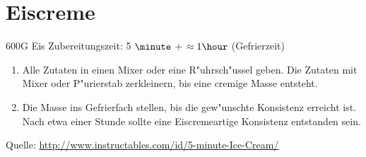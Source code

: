 \chapter{Eiscreme}
600G Eis \hfill Zubereitungszeit: 5 $\minute$ + $\approx1 \hour$ (Gefrierzeit)
\begin{enumerate}
\item	Alle Zutaten in einen Mixer oder eine R"uhrsch"ussel geben.
	Die Zutaten mit Mixer oder P"urierstab zerkleinern, bis eine cremige Masse entsteht.
\item   Die Masse ins Gefrierfach stellen, bis die gew"unschte Konsistenz erreicht ist.
	Nach etwa einer Stunde sollte eine Eiscremeartige Konsistenz entstanden sein.
\end{enumerate}

Quelle: \url{http://www.instructables.com/id/5-minute-Ice-Cream/}
